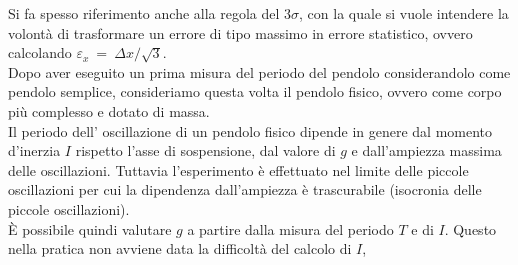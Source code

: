 \documentclass[italian, a4paper, 10pt, twocolumn]{../../style/lab_unige}
\newcommand{\treSigma}{$3\sigma$}
\newcommand{\mstdErr}[1]{\varepsilon_{#1}}
\begin{document}
    Si fa spesso riferimento anche alla regola del \treSigma, con la quale si vuole intendere la volontà di trasformare un errore di tipo massimo in errore statistico, ovvero calcolando $\mstdErr{x}~=~\Delta x/\sqrt{3}$.\\%

    Dopo aver eseguito un prima misura del periodo del pendolo considerandolo come pendolo semplice, consideriamo questa volta il pendolo fisico, ovvero come corpo più complesso e dotato di massa.\\
    Il periodo dell’ oscillazione di un pendolo fisico dipende in genere dal momento d'inerzia $I$ rispetto l’asse di sospensione, dal valore di $g$ e dall’ampiezza massima delle oscillazioni. Tuttavia l’esperimento è effettuato nel limite delle piccole oscillazioni per cui la dipendenza dall’ampiezza è trascurabile (isocronia delle piccole oscillazioni).\\
    È possibile quindi valutare $g$ a  partire dalla misura del periodo $T$ e di $I$.  Questo nella pratica non avviene data la difficoltà del calcolo di $I$,
\end{document}
